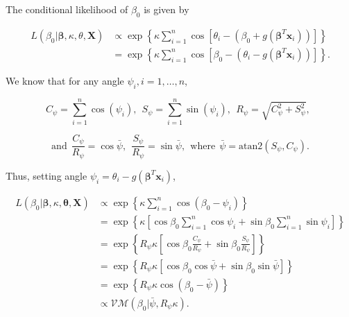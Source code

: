\documentclass[12pt,a4paper]{article}\usepackage[]{graphicx}\usepackage[]{color}
\begin{document}
The conditional likelihood of $\beta_0$ is given by

\begin{align*}
L(\beta_0 \vert \boldsymbol\beta, \kappa, \theta, \boldsymbol{X}) & \propto \exp \left\lbrace \kappa \sum_{i=1}^n \cos \left[ \theta_i - (\beta_0 + g(\boldsymbol\beta^T \boldsymbol{x}_i)) \right] \right\rbrace \\
& = \exp \left\lbrace \kappa \sum_{i=1}^n \cos \left[ \beta_0 - (\theta_i - g(\boldsymbol\beta^T \boldsymbol{x}_i)) \right]  \right\rbrace.
\end{align*}

We know that for any angle $\psi_i, i = 1, \dots, n$,

$$ C_{\psi} = \sum_{i=1}^n \cos(\psi_i), ~~ S_{\psi} = \sum_{i=1}^n \sin(\psi_i), ~~ R_{\psi} = \sqrt{C_{\psi}^2 + S_{\psi}^2}, ~~ $$

$$ \text{and} ~~ \frac{C_{\psi}}{R_{\psi}} = \cos \bar\psi, ~~ \frac{S_{\psi}}{R_{\psi}} = \sin \bar\psi, ~~ \text{where} ~~ \bar\psi = \text{atan2}(S_{\psi}, C_{\psi}). $$

Thus, setting angle $\psi_i = \theta_i - g(\boldsymbol\beta^T \boldsymbol{x}_i)$,


\begin{align*}
L(\beta_0 \vert \boldsymbol\beta, \kappa, \boldsymbol\theta, \boldsymbol{X}) & \propto \exp \left\lbrace \kappa \sum_{i=1}^n \cos ( \beta_0 - \psi_i)  \right\rbrace \\
& = \exp \left\lbrace \kappa   \left[ \cos\beta_0 \sum_{i=1}^n \cos\psi_i +  \sin\beta_0 \sum_{i=1}^n \sin\psi_i \right]  \right\rbrace \\
& = \exp \left\lbrace R_{\psi}  \kappa  \left[ \cos\beta_0 \frac{C_{\psi}}{R_{\psi}} +  \sin\beta_0 \frac{S_{\psi}}{R_{\psi}} \right]  \right\rbrace \\
& = \exp \left\lbrace R_{\psi} \kappa   \left[ \cos\beta_0 \cos{\bar\psi} +  \sin\beta_0 \sin{\bar\psi}\right]  \right\rbrace \\
& = \exp \left\lbrace R_{\psi} \kappa \cos \left( \beta_0 - \bar\psi \right)  \right\rbrace \\
& \propto \mathcal{VM}(\beta_0 \vert \bar\psi, R_{\psi} \kappa).
\end{align*}







\end{document}

